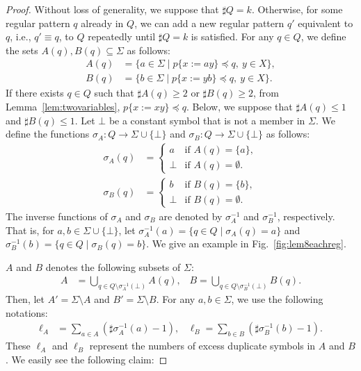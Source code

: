 \begin{proof}
Without loss of generality, we suppose that $\sharp Q = k$. Otherwise, for some regular pattern $q$ already in $Q$, we can add a new regular pattern $q'$ equivalent to $q$, i.e., $q' \equiv q$, to $Q$ repeatedly until $\sharp Q = k$ is satisfied.
For any $q \in Q$, we define the sets $A(q), B(q) \subseteq \Sigma$ as follows:
\begin{align*}
  A(q) & = \{ a \in \Sigma \mid p \{ x:=ay \} \preceq q,\ y\in X\},\\ 
  B(q) & = \{ b \in \Sigma \mid p \{ x:=yb \} \preceq q,\ y\in X\}.
  \end{align*}
If there exists $q\in Q$ such that $\sharp A(q)\geq 2$ or $\sharp B(q)\geq 2$, from Lemma~\ref{lem:twovariables}, $p\{x := xy\} \preceq q$.
Below, we suppose that $\sharp A(q)\leq 1$ and $\sharp B(q)\leq 1$.
Let $\bot$ be a constant symbol that is not a member in $\Sigma$.
We define the functions $\sigma_{A}: Q \rightarrow \Sigma \cup \{\bot\}$ and $\sigma_{B}: Q \rightarrow \Sigma \cup \{\bot\}$ as follows:
\begin{align*}
  \sigma_{A}(q) & =
  \begin{cases}
    a & \textrm{if } A(q) = \{a\}, \\
    \bot & \textrm{if } A(q) = \emptyset.
  \end{cases}\\
  \sigma_{B}(q) & =
  \begin{cases}
    b & \textrm{if } B(q) = \{b\}, \\
    \bot & \textrm{if } B(q) = \emptyset.
  \end{cases}
\end{align*}
The inverse functions of $\sigma_{A}$ and $\sigma_{B}$ are denoted by $\sigma_{A}^{-1}$ and $\sigma_{B}^{-1}$, respectively. That is, for $a,b \in \Sigma \cup \{\bot\}$, let $\sigma_{A}^{-1}(a) = \{q \in Q \mid \sigma_{A}(q) = a\}$ and $\sigma_{B}^{-1}(b) = \{q \in Q \mid \sigma_{B}(q) = b\}$. 
We give an example in Fig.~\ref{fig:lem8eachreg}.

$A$ and $B$ denotes the following subsets of $\Sigma$:
\begin{align*}
  A & = \bigcup_{q \in Q \setminus \sigma_{A}^{-1}(\bot)} A(q) \mbox{,~~~}
  B = \bigcup_{q \in Q \setminus \sigma_{B}^{-1}(\bot)} B(q).
\end{align*}
Then, let $A' = \Sigma \setminus A$ and $B' = \Sigma \setminus B$.
For any $a,b \in \Sigma$, we use the following notations:
\begin{align*}
  \ell_{A} &= \sum_{a \in A}(\sharp \sigma_{A}^{-1}(a) - 1) \mbox{,~~~}
    \ell_{B} = \sum_{b \in B}(\sharp \sigma_{B}^{-1}(b) - 1).
\end{align*}
These $\ell_{A}$ and $\ell_{B}$ represent the numbers of excess duplicate symbols in $A$ and $B$.
We easily see the following claim:  


\end{proof}
